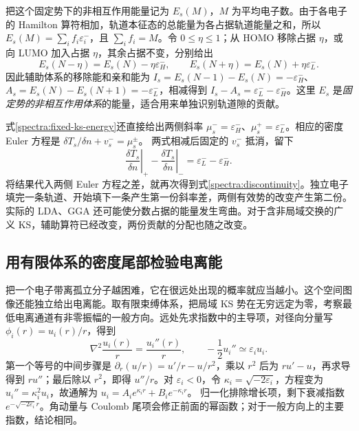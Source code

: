 把这个固定势下的非相互作用能量记为 $E_s(M)$，$M$ 为平均电子数。由于各电子的 Hamilton 算符相加，轨道本征态的总能量为各占据轨道能量之和，所以 $E_s(M)=\sum_i f_i\varepsilon_i^-$，且 $\sum_i f_i=M$。令 $0\le\eta\le1$；从 HOMO 移除占据 $\eta$，或向 LUMO 加入占据 $\eta$，其余占据不变，分别给出
\begin{equation}\label{spectra:fixed-ks-energy}
E_s(N-\eta)=E_s(N)-\eta\varepsilon_H^-,\qquad
E_s(N+\eta)=E_s(N)+\eta\varepsilon_L^-.
\end{equation}
因此辅助体系的移除能和亲和能为 $I_s=E_s(N-1)-E_s(N)=-\varepsilon_H^-$、$A_s=E_s(N)-E_s(N+1)=-\varepsilon_L^-$，相减得到 $I_s-A_s=\varepsilon_L^--\varepsilon_H^-$。这里 $E_s$ 是\emph{固定势的非相互作用体系}的能量，适合用来单独识别轨道隙的贡献。

式\eqref{spectra:fixed-ks-energy}还直接给出两侧斜率 $\mu_s^-=\varepsilon_H^-$、$\mu_s^+=\varepsilon_L^-$。相应的密度 Euler 方程是
$\delta T_s/\delta n+v_s^-=\mu_s^\pm$。
两式相减后固定的 $v_s^-$ 抵消，留下
\begin{equation}
\left.\frac{\delta T_s}{\delta n}\right|_+
-\left.\frac{\delta T_s}{\delta n}\right|_-
=\varepsilon_L^--\varepsilon_H^-.
\end{equation}
将结果代入两侧 Euler 方程之差，就再次得到式\eqref{spectra:discontinuity}。独立电子填完一条轨道、开始填下一条产生第一份斜率差，两侧有效势的改变产生第二份。实际的 LDA、GGA 还可能使分数占据的能量发生弯曲。对于含非局域交换的广义 KS，辅助算符已经改变，两份贡献的分配也随之改变。

\subsection{用有限体系的密度尾部检验电离能}
把一个电子带离孤立分子越困难，它在很远处出现的概率就应当越小。这个空间图像还能独立给出电离能。取有限束缚体系，把局域 KS 势在无穷远定为零，考察最低电离通道有非零振幅的一般方向。远处先求指数中的主导项，对径向分量写 $\phi_i(r)=u_i(r)/r$，得到
\begin{equation}
\nabla^2\frac{u_i(r)}r=\frac{u_i''(r)}r,
\qquad -\frac12u_i''\simeq\varepsilon_i u_i.
\end{equation}
第一个等号的中间步骤是 $\partial_r(u/r)=u'/r-u/r^2$，乘以 $r^2$ 后为 $ru'-u$，再求导得到 $ru''$；最后除以 $r^2$，即得 $u''/r$。对 $\varepsilon_i<0$，令 $\kappa_i=\sqrt{-2\varepsilon_i}$，方程变为 $u_i''=\kappa_i^2u_i$，故通解为
$u_i=A_i e^{\kappa_i r}+B_i e^{-\kappa_i r}$。
归一化排除增长项，剩下衰减指数 $e^{-\sqrt{-2\varepsilon_i}r}$。角动量与 Coulomb 尾项会修正前面的幂函数；对于一般方向上的主要指数，结论相同。


